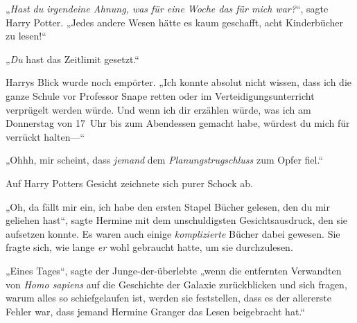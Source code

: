 „\emph{Hast du irgendeine Ahnung, was für eine Woche das für mich war?}“, sagte Harry Potter. „Jedes andere Wesen hätte es kaum geschafft, acht Kinderbücher zu lesen!“

„\emph{Du} hast das Zeitlimit gesetzt.“

Harrys Blick wurde noch empörter. „Ich konnte absolut nicht wissen, dass ich die ganze Schule vor Professor Snape retten oder im Verteidigungsunterricht verprügelt werden würde. Und wenn ich dir erzählen würde, was ich am Donnerstag von 17~Uhr bis zum Abendessen gemacht habe, würdest du mich für verrückt halten—“

„Ohhh, mir scheint, dass \emph{jemand} dem \emph{Planungstrugschluss} zum Opfer fiel.“

Auf Harry Potters Gesicht zeichnete sich purer Schock ab.

„Oh, da fällt mir ein, ich habe den ersten Stapel Bücher gelesen, den du mir geliehen hast“, sagte Hermine mit dem unschuldigsten Gesichtsausdruck, den sie aufsetzen konnte. Es waren auch einige \emph{komplizierte} Bücher dabei gewesen. Sie fragte sich, wie lange \emph{er} wohl gebraucht hatte, um sie durchzulesen.

„Eines Tages“, sagte der Junge-der-überlebte „wenn die entfernten Verwandten von \emph{Homo sapiens} auf die Geschichte der Galaxie zurückblicken und sich fragen, warum alles so schiefgelaufen ist, werden sie feststellen, dass es der allererste Fehler war, dass jemand Hermine Granger das Lesen beigebracht hat.“


